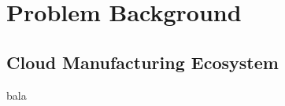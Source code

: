 \section{Problem Background} %
\label{sec:problem_background}

\subsection{Cloud Manufacturing Ecosystem} %
\label{sub:cloud_manufacturing_ecosystem}
bala \cite{Starfield1993}
